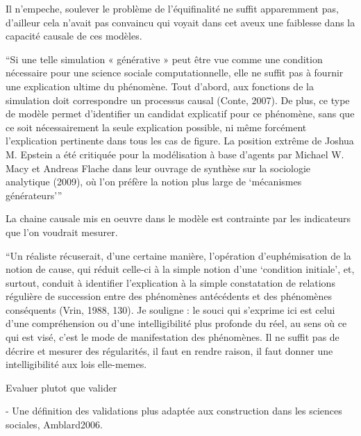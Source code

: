 Il n'empeche, soulever le problème de l'équifinalité ne suffit apparemment pas, d'ailleur cela n'avait pas convaincu \textcite{Yanoff2008} qui voyait dans cet aveux une faiblesse dans la capacité causale de ces modèles. 

\enquote{Si une telle simulation « générative » peut être vue comme une condition nécessaire pour une science sociale computationnelle, elle ne suffit pas à fournir une explication ultime du phénomène. Tout d’abord, aux fonctions de la simulation doit correspondre un processus causal (Conte, 2007). De plus, ce type de modèle permet d’identifier un candidat explicatif pour ce phénomène, sans que ce soit nécessairement la seule explication possible, ni même forcément l’explication pertinente dans tous les cas de figure. La position extrême de Joshua M. Epstein a été critiquée pour la modélisation à base d’agents par Michael W. Macy et Andreas Flache dans leur ouvrage de synthèse sur la sociologie analytique (2009), où l’on préfère la notion plus large de \enquote{mécanismes générateurs}} \autocite{Livet2014}

La chaine causale mis en oeuvre dans le modèle est contrainte par les indicateurs que l'on voudrait mesurer.

“Un réaliste récuserait, d’une certaine manière, l’opération d’euphémisation de la notion de cause, qui réduit celle-ci à la simple notion d’une ‘condition initiale’, et, surtout, conduit à identifier l’explication à la simple constatation de relations régulière de succession entre des phénomènes antécédents et des phénomènes conséquents (Vrin, 1988, 130). 
Je souligne : le souci qui s’exprime ici est celui d’une compréhension ou d’une intelligibilité plus profonde du réel, au sens où ce qui est visé, c’est le mode de manifestation des phénomènes. Il ne suffit pas de décrire et mesurer des régularités, il faut en rendre raison, il faut donner une intelligibilité aux lois elle-memes.


Evaluer plutot que valider


- Une définition des validations plus adaptée aux construction dans les sciences sociales, Amblard2006. 



